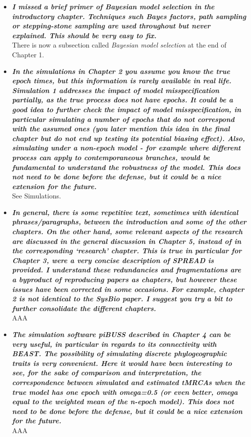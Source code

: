 \documentclass[english]{article}
\begin{document}
\begin{itemize}

\item {
{\it
\textbf{
I missed a brief primer of Bayesian model selection in the introductory chapter.
Techniques such Bayes factors, path sampling or stepping-stone sampling are used throughout but never explained. 
This should be very easy to fix.
}%
}%
}%
\\
There is now a subsection called \emph{Bayesian model selection} at the end of Chapter 1.



\item {
{\it
\textbf{
In the simulations in Chapter 2 you assume you know the true epoch times, but this information is rarely available in real life. 
Simulation 1 addresses the impact of model misspecification partially, as the true process does not have epochs. 
It could be a good idea to further check the impact of model misspecification, in particular simulating a number of epochs that do not correspond with the assumed ones (you later mention this idea in the final chapter but do not end up testing its potential biasing effect). 
Also, simulating under a non-epoch model - for example where different process can apply to contemporaneous branches, would be fundamental to understand the robustness of the model. 
This does not need to be done before the defense, but it could be a nice extension for the future.
}%
}%
}%
\\
See Simulations.

\item {
{\it
\textbf{
In general, there is some repetitive text, sometimes with identical phrases/paragraphs, between the introduction and some of the other chapters. 
On the other hand, some relevant aspects of the research are discussed in the general discussion in Chapter 5, instead of in the corresponding `research' chapter. 
This is true in particular for Chapter 3, were a very concise description of SPREAD is provided. 
I understand these redundancies and fragmentations are a byproduct of reproducing papers as chapters, but however these issues have been corrected in some occasions. 
For example, chapter 2 is not identical to the SysBio paper. 
I suggest you try a bit to further consolidate the different chapters.
}%
}%
}%
\\
AAA




\item {
{\it
\textbf{
The simulation software piBUSS described in Chapter 4 can be very useful, in particular in regards to its connectivity with BEAST. 
The possibility of simulating discrete phylogeographic traits is very convenient. 
Here it would have been interesting to see, for the sake of comparison and interpretation, the correspondence between simulated and estimated tMRCAs when the true model has one epoch with omega=0.5 (or even better, omega equal to the weighted mean of the n-epoch model). 
This does not need to be done before the defense, but it could be a nice extension for the future.
}%
}%
}%
\\
AAA



\end{itemize}
\end{document}
